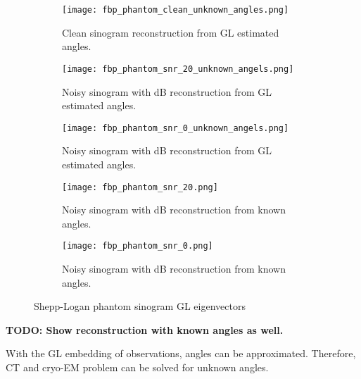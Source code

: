 \begin{figure}[H]
    \captionsetup[subfigure]{justification=centering}
    \centering
    \begin{subfigure}[t]{0.3\textwidth}
        \texttt{[image: fbp\_phantom\_clean\_unknown\_angles.png]}
        \caption{Clean sinogram reconstruction from GL estimated angles.}
        \label{fig:clean_reco_unknown}
    \end{subfigure}\hfill
    \begin{subfigure}[t]{0.3\textwidth}
      \texttt{[image: fbp\_phantom\_snr\_20\_unknown\_angels.png]}
      \caption{Noisy sinogram with  dB reconstruction from GL estimated angles.}
      \label{fig:noisy_snr20_reco_unknown}
    \end{subfigure}\hfill
    \begin{subfigure}[t]{0.3\textwidth}
      \texttt{[image: fbp\_phantom\_snr\_0\_unknown\_angels.png]}
      \caption{Noisy sinogram with  dB reconstruction from GL estimated angles.}
      \label{fig:noisy_snr10_reco_unknown}
    \end{subfigure}

    \begin{subfigure}[t]{0.3\textwidth}
      \texttt{[image: fbp\_phantom\_snr\_20.png]}
      \caption{Noisy sinogram with  dB reconstruction from known angles.}
      \label{fig:noisy_snr20_reco_unknown}
    \end{subfigure}\hfill
    \begin{subfigure}[t]{0.3\textwidth}
      \texttt{[image: fbp\_phantom\_snr\_0.png]}
      \caption{Noisy sinogram with  dB reconstruction from known angles.}
      \label{fig:noisy_snr10_reco_unknown}
    \end{subfigure}

    \caption{Shepp-Logan phantom sinogram GL eigenvectors}
    \label{fig:phantom_fbp_unknown_angles}
  \end{figure}

  \textbf{TODO: Show reconstruction with known angles as well.}

  \begin{tcolorbox}[colback=red!5!white,colframe=red!75!black]
    With the GL embedding of observations, angles can be approximated.
    Therefore, CT and cryo-EM problem can be solved for unknown angles.
  \end{tcolorbox}

